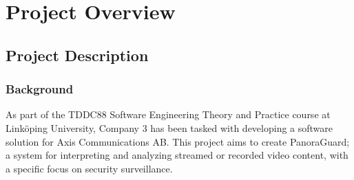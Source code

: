     
    
    
    

\section{Project Overview}
\subsection{Project Description}
    
\subsubsection{Background}
As part of the TDDC88 Software Engineering Theory and Practice course at Linköping University, Company 3 has been tasked with developing a software solution for Axis Communications AB. This project aims to create PanoraGuard; a system for interpreting and analyzing streamed or recorded video content, with a specific focus on security surveillance.
    
